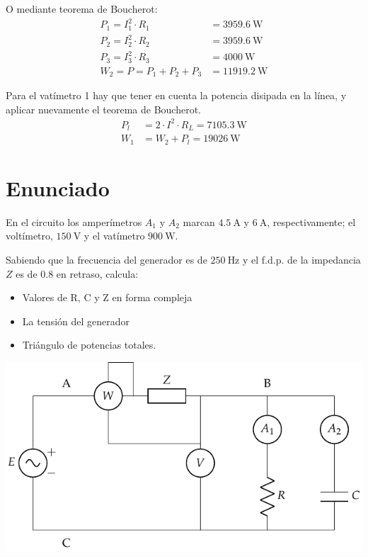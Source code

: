O mediante teorema de Boucherot:
\begin{align*}
  P_1 = I_1^2 \cdot R_1 &= \qty{3959.6}{\watt}\\
  P_2 = I_2^2 \cdot R_2 &= \qty{3959.6}{\watt}\\
  P_3 = I_3^2 \cdot R_3 &= \qty{4000}{\watt}\\
  W_2 = P = P_1 + P_2 + P_3 &= \qty{11919.2}{\watt}
\end{align*}

Para el vatímetro 1 hay que tener en cuenta la potencia disipada en la línea, y aplicar nuevamente el teorema de Boucherot.
\begin{align*}
P_l &= 2 \cdot I^2 \cdot R_L = \qty{7105.3}{\watt}\\
W_1 &= W_2 + P_l = \qty{19026}{\watt}
\end{align*}



\section{Enunciado}
En el circuito los amperímetros $A_1$ y $A_2$ marcan $\qty{4.5}{\ampere}$ y $\qty{6}{\ampere}$, respectivamente; el voltímetro, $\qty{150}{\volt}$ y el
vatímetro $\qty{900}{\watt}$.

Sabiendo que la frecuencia del generador es de $\qty{250}{\hertz}$ y el f.d.p. de la impedancia $Z$ es de 0.8 en retraso, calcula:

\begin{itemize}
\item Valores de R, C y Z en forma compleja
\item La tensión del generador
\item Triángulo de potencias totales.
\end{itemize}

\begin{center}
  \includegraphics[width=0.45\linewidth]{figuras/BT2_09.pdf}
\end{center}


